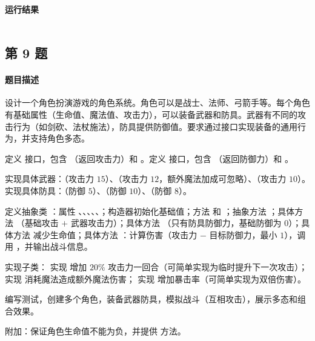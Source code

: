 \documentclass{academics}
\begin{document}
\paragraph{运行结果} {
    \inputminted{text}{../res/P08.out}
}

\subsection{第 9 题}

\paragraph{题目描述} {
    设计一个角色扮演游戏的角色系统。角色可以是战士、法师、弓箭手等。每个角色有基础属性（生命值、魔法值、攻击力），可以装备武器和防具。武器有不同的攻击行为（如剑砍、法杖施法），防具提供防御值。要求通过接口实现装备的通用行为，并支持角色多态。

    定义  接口，包含 （返回攻击力）和 。定义  接口，包含 （返回防御力）和 。

    实现具体武器：（攻击力 $15$）、（攻击力 $12$，额外魔法加成可忽略）、（攻击力 $10$）。实现具体防具：（防御 $5$）、（防御 $10$）、（防御 $8$）。

    定义抽象类 ：属性 、、、、、；构造器初始化基础值；方法  和 ；抽象方法 ；具体方法 （基础攻击 $+$ 武器攻击力）；具体方法 （只有防具防御力，基础防御为 $0$）；具体方法  减少生命值；具体方法 ：计算伤害（攻击力 $-$ 目标防御力，最小 $1$），调用 ，并输出战斗信息。

    实现子类： 实现  增加 $20\%$ 攻击力一回合（可简单实现为临时提升下一次攻击）； 实现  消耗魔法造成额外魔法伤害； 实现  增加暴击率（可简单实现为双倍伤害）。

    编写测试，创建多个角色，装备武器防具，模拟战斗（互相攻击），展示多态和组合效果。

    附加：保证角色生命值不能为负，并提供  方法。
}
\end{document}
